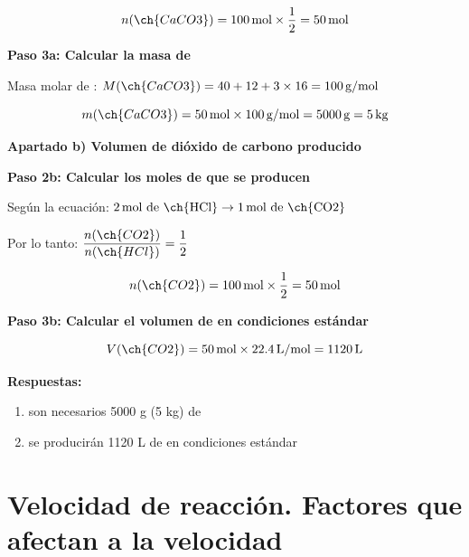 \begin{exercise}
\begin{solu}
        \begin{equation*}
            n(\ch{CaCO3}) = 100\,\text{mol} \times \frac{1}{2} = 50\,\text{mol}
        \end{equation*}

        \textbf{Paso 3a: Calcular la masa de }

        Masa molar de : $M(\ch{CaCO3}) = 40 + 12 + 3 \times 16 = 100\,\text{g/mol}$

        \begin{equation*}
            m(\ch{CaCO3}) = 50\,\text{mol} \times 100\,\text{g/mol} = 5000\,\text{g} = 5\,\text{kg}
        \end{equation*}

        \textbf{Apartado b) Volumen de dióxido de carbono producido}

        \textbf{Paso 2b: Calcular los moles de  que se producen}

        Según la ecuación: $2\,\text{mol de \ch{HCl}} \rightarrow 1\,\text{mol de \ch{CO2}}$

        Por lo tanto: $\dfrac{n(\ch{CO2})}{n(\ch{HCl})} = \dfrac{1}{2}$

        \begin{equation*}
            n(\ch{CO2}) = 100\,\text{mol} \times \frac{1}{2} = 50\,\text{mol}
        \end{equation*}

        \textbf{Paso 3b: Calcular el volumen de  en condiciones estándar}

        \begin{equation*}
            V(\ch{CO2}) = 50\,\text{mol} \times 22.4\,\text{L/mol} = 1120\,\text{L}
        \end{equation*}

        \textbf{Respuestas:}
        \begin{enumerate}[label=\letraminuscula]
            \item son necesarios 5000 g (5 kg) de 
            \item se producirán 1120 L de  en condiciones estándar
        \end{enumerate}
    \end{solu}
\end{exercise}

\section{Velocidad de reacción. Factores que afectan a la velocidad}

